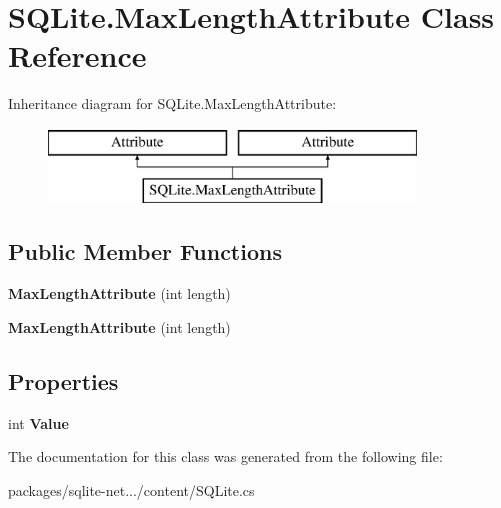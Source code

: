 \hypertarget{classSQLite_1_1MaxLengthAttribute}{\section{S\-Q\-Lite.\-Max\-Length\-Attribute Class Reference}
\label{classSQLite_1_1MaxLengthAttribute}
}
Inheritance diagram for S\-Q\-Lite.\-Max\-Length\-Attribute\-:\begin{figure}[H]
\begin{center}
\leavevmode
\includegraphics[height=2.000000cm]{classSQLite_1_1MaxLengthAttribute}
\end{center}
\end{figure}
\subsection*{Public Member Functions}
\begin{DoxyCompactItemize}
\item 
\hypertarget{classSQLite_1_1MaxLengthAttribute_ade550746d23ce2d766d0e1debe57c606}{{\bfseries Max\-Length\-Attribute} (int length)}\label{classSQLite_1_1MaxLengthAttribute_ade550746d23ce2d766d0e1debe57c606}

\item 
\hypertarget{classSQLite_1_1MaxLengthAttribute_ade550746d23ce2d766d0e1debe57c606}{{\bfseries Max\-Length\-Attribute} (int length)}\label{classSQLite_1_1MaxLengthAttribute_ade550746d23ce2d766d0e1debe57c606}

\end{DoxyCompactItemize}
\subsection*{Properties}
\begin{DoxyCompactItemize}
\item 
\hypertarget{classSQLite_1_1MaxLengthAttribute_a12e006bbd11ded434ccba4873d48b84a}{int {\bfseries Value}}\label{classSQLite_1_1MaxLengthAttribute_a12e006bbd11ded434ccba4873d48b84a}

\end{DoxyCompactItemize}


The documentation for this class was generated from the following file\-:\begin{DoxyCompactItemize}
\item 
packages/sqlite-\/net.../content/S\-Q\-Lite.\-cs\end{DoxyCompactItemize}
